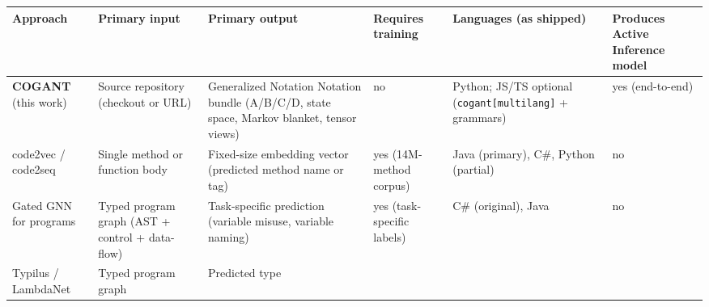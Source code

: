 \documentclass[
]{article}
\newcounter{none} %
\begin{document}
{\def\LTcaptype{none} %
\begin{longtable}[]{@{}
  >{\raggedright\arraybackslash}p{}
  >{\raggedright\arraybackslash}p{}
  >{\raggedright\arraybackslash}p{}
  >{\centering\arraybackslash}p{}
  >{\raggedright\arraybackslash}p{}
  >{\centering\arraybackslash}p{}@{}}
\toprule\noalign{}
\begin{minipage}[b]{\linewidth}\raggedright
Approach
\end{minipage} & \begin{minipage}[b]{\linewidth}\raggedright
Primary input
\end{minipage} & \begin{minipage}[b]{\linewidth}\raggedright
Primary output
\end{minipage} & \begin{minipage}[b]{\linewidth}\centering
Requires training
\end{minipage} & \begin{minipage}[b]{\linewidth}\raggedright
Languages (as shipped)
\end{minipage} & \begin{minipage}[b]{\linewidth}\centering
Produces Active Inference model
\end{minipage} \\
\midrule\noalign{}
\endhead
\bottomrule\noalign{}
\endlastfoot
\textbf{COGANT} (this work) & Source repository (checkout or URL) &
Generalized Notation Notation bundle (A/B/C/D, state space, Markov
blanket, tensor views) & no & Python; JS/TS optional
(\texttt{cogant{[}multilang{]}} + grammars) & yes (end-to-end) \\
code2vec / code2seq \citep{alon2019code2vec} & Single method or function
body & Fixed-size embedding vector (predicted method name or tag) & yes
(14M-method corpus) & Java (primary), C\#, Python (partial) & no \\
Gated GNN for programs \citep{allamanis2018learning, li2016gated} &
Typed program graph (AST + control + data-flow) & Task-specific
prediction (variable misuse, variable naming) & yes (task-specific
labels) & C\# (original), Java & no \\
Typilus \citep{allamanis2020typilus} / LambdaNet
\citep{wei2020lambdanet} & Typed program graph & Predicted type

\end{longtable}}
\end{document}
